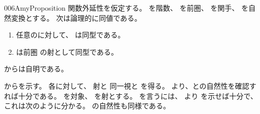 \documentclass[index]{subfiles}
\begin{document}
\begin{myBlock}{006A}{myProposition}
  関数外延性を仮定する。
  を階数、
  を前圏、
  を関手、
  を自然変換とする。
  次は論理的に同値である。
  \begin{enumerate}
  \item \label{006A:0000} 任意のに対して、
    は同型である。
  \item \label{006A:0001} は前圏
    の射として同型である。
  \end{enumerate}
\end{myBlock}
\StartDefiningTabulars
\begin{myProof}
  からは自明である。

  からを示す。
  各に対して、
  射と
  同一視と
  を得る。
  より、との自然性を確認すれば十分である。
  を対象、
  を射とする。
  を言うには、
  より
  を示せば十分で、
  これは次のように分かる。
  の自然性も同様である。
\end{myProof}
\StopDefiningTabulars
\end{document}

